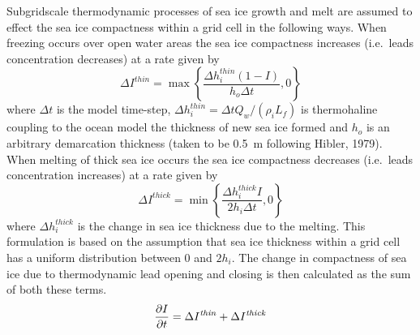 Subgridscale thermodynamic processes of sea ice growth and melt are assumed
to effect the sea ice compactness within a grid cell in the
following ways.
When freezing occurs over open water areas the sea ice compactness
increases (i.e.\ leads concentration decreases) at a rate given by
\begin{equation}
\label{eqn:leads-freeze}
\Delta I^{\mathit{thin}} = \max\left\{\frac{\Delta
h_i^{\mathit{thin}}(1 - I)}{h_o \Delta t},0\right\}
\end{equation}
where $\Delta t$ is the model time-step,
$\Delta h_i^{\mathit{thin}} = \Delta t Q_w/(\rho_i L_f)$ is thermohaline coupling to the ocean model
the thickness of new sea ice formed and 
$h_o$ is an arbitrary demarcation thickness
(taken to be 0.5~m following Hibler, 1979).\nocite{hibler79}
When melting of thick sea ice occurs the sea ice compactness
decreases (i.e.\ leads concentration increases) at a rate given by
\begin{equation}
\label{eqn:leads-melt}
\Delta I^{\mathit{thick}} = \min \left\{\frac{\Delta h_i^{\mathit{thick}}
I}{2 h_i \Delta t},0\right\}
\end{equation}
where $\Delta h_i^{\mathit{thick}}$ is the change in sea ice
thickness due to the melting.
This formulation is based on the assumption that sea ice
thickness within a grid cell has a uniform distribution between $0$
and $2 h_i$.
The change in compactness of sea ice due to thermodynamic lead
opening and closing is then calculated as the sum of both these
terms.
\begin{equation}
{\partial I \over {\partial t}} =
\Delta I^{\mathit{thin}} + \Delta I^{\mathit{thick}}
\end{equation}


